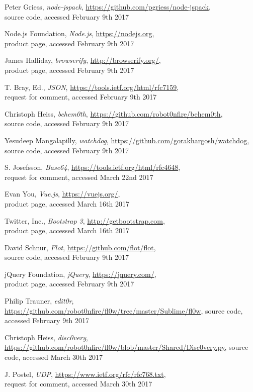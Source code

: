 \documentclass[conference,a4paper]{IEEEtran}
\begin{document}
\begin{thebibliography}{1}
Peter Griess, \emph{node-jspack}, \url{https://github.com/pgriess/node-jspack},\\ source code,
accessed February 9th 2017

Node.js Foundation, \emph{Node.js}, \url{https://nodejs.org},\\ product page,
accessed February 9th 2017

James Halliday, \emph{browserify}, \url{http://browserify.org/},\\ product page,
accessed February 9th 2017

T. Bray, Ed., \emph{JSON}, \url{https://tools.ietf.org/html/rfc7159},\\ request for comment,
accessed February 9th 2017

Christoph Heiss, \emph{behem0th}, \url{https://github.com/robot0nfire/behem0th},\\ source code,
accessed February 9th 2017

Yesudeep Mangalapilly, \emph{watchdog}, \url{https://github.com/gorakhargosh/watchdog}, source code,
accessed February 9th 2017

S. Josefsson, \emph{Base64}, \url{https://tools.ietf.org/html/rfc4648}, \\ request for comment,
accessed March 22nd 2017

Evan You, \emph{Vue.js}, \url{https://vuejs.org/},\\ product page,
accessed March 16th 2017

Twitter, Inc., \emph{Bootstrap 3}, \url{http://getbootstrap.com},\\ product page,
accessed March 16th 2017

David Schnur, \emph{Flot}, \url{https://github.com/flot/flot},\\ source code,
accessed February 9th 2017

jQuery Foundation, \emph{jQuery}, \url{https://jquery.com/},\\ product page,
accessed February 9th 2017

Philip Trauner, \emph{edit0r}, \url{https://github.com/robot0nfire/fl0w/tree/master/Sublime/fl0w}, source code, accessed February 9th 2017

Christoph Heiss, \emph{disc0very}, \url{https://github.com/robot0nfire/fl0w/blob/master/Shared/Disc0very.py}, source code, accessed March 30th 2017

J. Postel, \emph{UDP}, \url{https://www.ietf.org/rfc/rfc768.txt},\\ request for comment, accessed March 30th 2017


\end{thebibliography}
\end{document}
